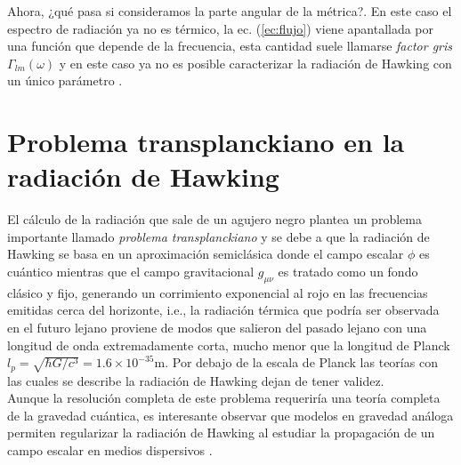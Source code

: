 Ahora, ¿qu\'{e} pasa si consideramos la parte angular de la m\'{e}trica?. En este caso el espectro de radiaci\'{o}n ya no es t\'{e}rmico, la ec. (\ref{ec:flujo}) viene apantallada por una funci\'{o}n que depende de la frecuencia, esta cantidad suele llamarse\textit{ factor gris} $\Gamma_{lm}(\omega)$ y en este caso ya no es posible caracterizar la radiaci\'{o}n de Hawking con un \'{u}nico par\'{a}metro \citep{mukhanov2007introduction}.\\


\section{Problema transplanckiano en la radiaci\'{o}n de Hawking}

El cálculo de la radiaci\'{o}n que sale de un agujero negro plantea un problema importante llamado \textit{problema transplanckiano} y se debe a que la radiaci\'{o}n de Hawking se basa en un aproximación semiclásica donde el campo escalar $\phi$ es cu\'{a}ntico mientras que el campo gravitacional $g_{\mu \nu}$ es tratado como un fondo clásico y fijo, generando un corrimiento exponencial al rojo en las frecuencias emitidas cerca del horizonte, i.e., la radiaci\'{o}n t\'{e}rmica que podr\'{i}a ser observada en el futuro lejano proviene de modos que salieron del pasado lejano con una longitud de onda extremadamente corta, mucho menor que la longitud de Planck  $l_p=\sqrt{\hbar G/c^3}=1.6\times 10^{-35}\text{m}$. Por debajo de la escala de Planck las teor\'{i}as con las cuales se describe la radiaci\'{o}n de Hawking dejan de tener validez.\\

Aunque la resolución completa de este problema requeriría una teoría completa de la gravedad cuántica, es interesante observar que modelos en gravedad an\'aloga permiten regularizar la radiaci\'{o}n de Hawking al estudiar la propagaci\'{o}n de un campo escalar en medios dispersivos \citep{jacobson1996introductory}.